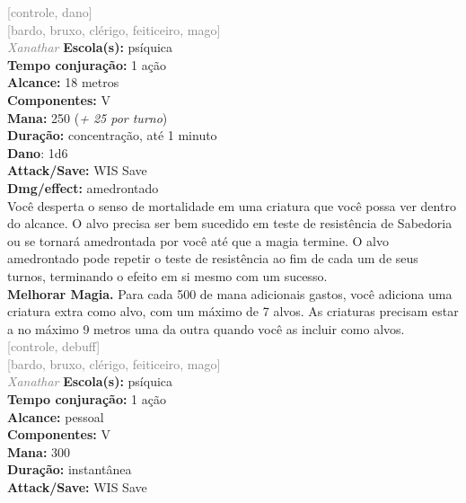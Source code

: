 \documentclass{RPG_Adventure}[2021/10/20]
\begin{document}
{\scriptsize \textcolor{gray}{[controle, dano]\\}}
{\scriptsize \textcolor{gray}{[bardo, bruxo, clérigo, feiticeiro, mago]\\}}
{\tiny \textcolor{gray}{\textit{Xanathar}}}
{\small \t \textbf{Escola(s):} psíquica\\\t \textbf{Tempo conjuração:} 1 ação\\\t \textbf{Alcance:} 18 metros\\\t \textbf{Componentes:} V\\\t \textbf{Mana:} 250 (\textit{+ 25 por turno})\\\t \textbf{Duração:} concentração, até 1 minuto\\\t \textbf{Dano}: 1d6\\\t \textbf{Attack/Save:} WIS Save\\\t \textbf{Dmg/effect:} amedrontado\\}
{\normalsize Você desperta o senso de mortalidade em uma criatura que você possa ver dentro do alcance. O alvo precisa ser bem sucedido em teste de resistência de Sabedoria ou se tornará amedrontada por você até que a magia termine. O alvo amedrontado pode repetir o teste de resistência ao fim de cada um de seus turnos, terminando o efeito em si mesmo com um sucesso.\\\t \textbf{Melhorar Magia.} Para cada 500 de mana adicionais gastos, você adiciona uma criatura extra como alvo, com um máximo de 7 alvos. As criaturas precisam estar a no máximo 9 metros uma da outra quando você as incluir como alvos.\\}
{\scriptsize \textcolor{gray}{[controle, debuff]\\}}
{\scriptsize \textcolor{gray}{[bardo, bruxo, clérigo, feiticeiro, mago]\\}}
{\tiny \textcolor{gray}{\textit{Xanathar}}}
{\small \t \textbf{Escola(s):} psíquica\\\t \textbf{Tempo conjuração:} 1 ação\\\t \textbf{Alcance:} pessoal\\\t \textbf{Componentes:} V\\\t \textbf{Mana:} 300\\\t \textbf{Duração:} instantânea\\\t \textbf{Attack/Save:} WIS Save\\}
\end{document}
